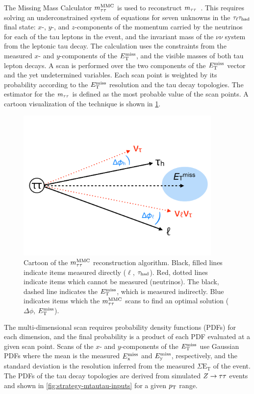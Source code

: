 The Missing Mass Calculator $m_{\tau\tau}^\text{MMC}$ is used to reconstruct $m_{\tau\tau}$~\cite{2011.mmc}. This requires solving an underconstrained system of equations for seven unknowns in the $\tau_\ell\tau_\text{had}$ final state: $x$-, $y$-, and $z$-components of the momentum carried by the neutrinos for each of the tau leptons in the event, and the invariant mass of the $\nu\nu$ system from the leptonic tau decay. The calculation uses the constraints from the measured $x$- and $y$-components of the $E_{\mathrm{T}}^{\mathrm{miss}}$, and the visible masses of both tau lepton decays. A scan is performed over the two components of the $E_{\mathrm{T}}^{\mathrm{miss}}$ vector and the yet undetermined variables. Each scan point is weighted by its probability according to the $E_{\mathrm{T}}^{\mathrm{miss}}$ resolution and the tau decay topologies. The estimator for the $m_{\tau\tau}$ is defined as the most probable value of the scan points. A cartoon visualization of the technique is shown in \cref{fig:strategy-mtautau-cartoon}.

\begin{figure}[tp]
  \centering
  \includegraphics[width=0.90\textwidth]{figures/mtautau/mmc-cartoon}
  \caption{Cartoon of the $m_{\tau\tau}^\text{MMC}$ reconstruction algorithm. Black, filled lines indicate items measured directly ($\ell$, $\tau_\text{had}$). Red, dotted lines indicate items which cannot be measured (neutrinos). The black, dashed line indicates the $E_{\mathrm{T}}^{\mathrm{miss}}$, which is measured indirectly. Blue indicates items which the $m_{\tau\tau}^\text{MMC}$ scans to find an optimal solution ($\Delta\phi$, $E_{\mathrm{T}}^{\mathrm{miss}}$).}
  \label{fig:strategy-mtautau-cartoon}
\end{figure}

The multi-dimensional scan requires probability density functions (PDFs) for each dimension, and the final probability is a product of each PDF evaluated at a given scan point. Scans of the $x$- and $y$-components of the $E_{\mathrm{T}}^{\mathrm{miss}}$ use Gaussian PDFs where the mean is the measured $E_{\mathrm{x}}^{\mathrm{miss}}$ and $E_{\mathrm{y}}^{\mathrm{miss}}$, respectively, and the standard deviation is the resolution inferred from the measured $\Sigma \text{E}_\text{T}$ of the event. The PDFs of the tau decay topologies are derived from simulated $Z\rightarrow\tau\tau$ events and shown in \cref{fig:strategy-mtautau-inputs} for a given $p_{\mathrm{T}}$ range.


